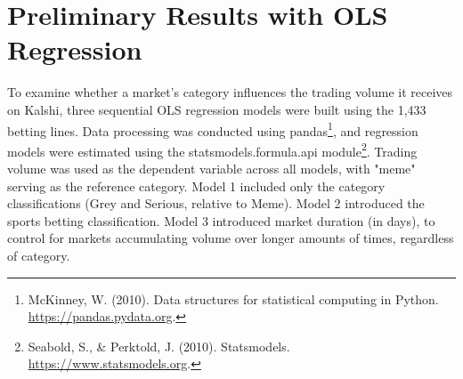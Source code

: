 \documentclass{article}
\begin{document}





\section{Preliminary Results with OLS Regression}
To examine whether a market's category influences the trading volume it receives on Kalshi, three sequential OLS regression models were built using the 1,433 betting lines. Data processing was conducted using pandas\footnote{McKinney, W. (2010). Data structures for statistical computing in Python. \url{https://pandas.pydata.org}.}, and regression models were estimated using the statsmodels.formula.api module\footnote{Seabold, S., \& Perktold, J. (2010). Statsmodels. \url{https://www.statsmodels.org}.}. Trading volume was used as the dependent variable across all models, with "meme" serving as the reference category. Model 1 included only the category classifications (Grey and Serious, relative to Meme). Model 2 introduced the sports betting classification. Model 3 introduced market duration (in days), to control for markets accumulating volume over longer amounts of times, regardless of category.
\label{sec:others}
\end{document}
